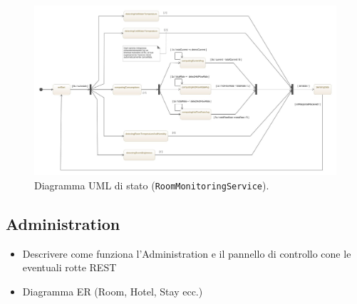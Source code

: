 \begin{figure}[H]
    \centering
    \includegraphics[width=\textwidth]{images/room-monitoring-service-state-diagram.jpeg}\hfill
    \caption{\label{rm-uml-state}Diagramma UML di stato (\texttt{RoomMonitoringService}).}
\end{figure}

\subsection{Administration}
\begin{itemize}
    \item Descrivere come funziona l'Administration e il pannello di controllo cone le eventuali rotte REST
    \item Diagramma ER (Room, Hotel, Stay ecc.)
\end{itemize}


\newpage